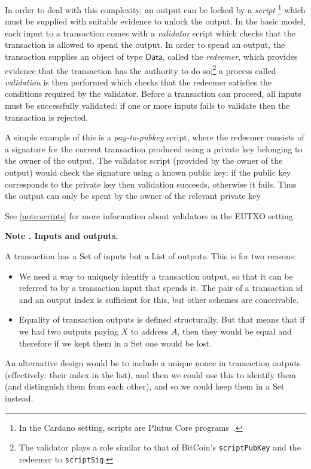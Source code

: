 \documentclass[a4paper]{article}
\newcounter{note}
\newcommand{\note}[1]{
  \bigskip
  \refstepcounter{note}
  \noindent\textbf{Note \thenote. #1}
}
\renewcommand{\i}{\textit}  %
\newcommand{\s}{\textsf}  %
\newcommand{\Data}{\ensuremath{\s{Data}}}
\begin{document}
In order to deal with this complexity, an output can be locked by a
\textit{script}%
\footnote{In the Cardano setting, scripts are Plutus Core
  programs~\citep{Plutus-Core-spec}.}
which must be supplied with suitable evidence to unlock the output.
In the basic model, each input to a transaction comes with a
\i{validator} script which checks that the transaction is allowed to
spend the output.  In order to spend an output, the transaction
supplies an object of type $\Data$, called the \i{redeemer}, which provides
evidence that the transaction has the authority to do so;\footnote{The
  validator plays a role similar to that of BitCoin's
  \texttt{scriptPubKey} and the redeemer to \texttt{scriptSig}.
} a process called \i{validation} is then performed which checks that
the redeemer satisfies the conditions required by the validator.
Before a transaction can proceed, all inputs must be successfully
validated: if one or more inputs fails to validate then the
transaction is rejected.

A simple example of this is a \i{pay-to-pubkey} script, where the
redeemer consists of a signature for the current transaction produced
using a private key belonging to the owner of the output.  The
validator script (provided by the owner of the output) would check the
signature using a known public key: if the public key corresponds to
the private key then validation succeeds, otherwise it fails.  Thus
the output can only be spent by the owner of the relevant private key

See \cref{note:scripts} for more information about validators in
the EUTXO setting.

\note{Inputs and outputs.}
\label{note:inputs-and-outputs}
A transaction has a \textsf{Set} of inputs but a \textsf{List} of outputs.
This is for two reasons:
\begin{itemize}
  \item We need a way to uniquely identify a transaction output, so
  that it can be referred to by a transaction input that spends it. The pair of
  a transaction id and an output index is sufficient for this, but other schemes
  are conceivable.
  \item Equality of transaction outputs is defined structurally. But that means
    that if we had two outputs paying $X$ to address $A$, then they would be
    equal and therefore if we kept them in a \s{Set} one would be lost.
\end{itemize}

\noindent An alternative design would be to include a unique nonce in transaction outputs
(effectively: their index in the list), and then we could use this to identify
them (and distinguish them from each other), and so we could keep them in a \s{Set} instead.
\end{document}
